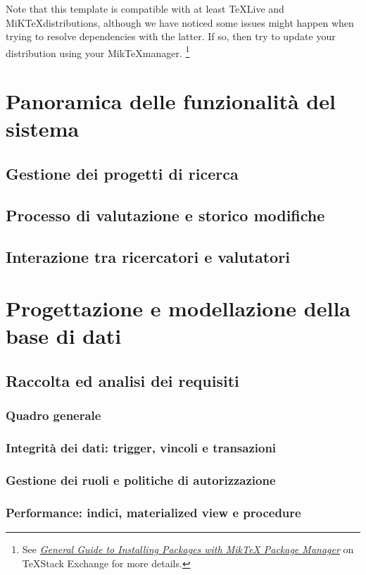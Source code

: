 \documentclass{report}
\begin{document}
Note that this template is compatible with at least \TeX Live and MiK\TeX distributions, although we have noticed some issues might happen when trying to resolve dependencies with the latter. 
If so, then try to update your distribution using your Mik\TeX manager.
\footnote{See \textit{\href{https://tex.stackexchange.com/a/359851}{General Guide to Installing Packages with MikTeX Package Manager}} on \TeX Stack Exchange for more details.}


\chapter{Panoramica delle funzionalità del sistema}

\section{Gestione dei progetti di ricerca}

\section{Processo di valutazione e storico modifiche}

\section{Interazione tra ricercatori e valutatori}


\chapter{Progettazione e modellazione della base di dati}
\section{Raccolta ed analisi dei requisiti}
\subsection{Quadro generale}
\subsection{Integrità dei dati: trigger, vincoli e transazioni}
\subsection{Gestione dei ruoli e politiche di autorizzazione}
\subsection{Performance: indici, materialized view e procedure }
\end{document}
